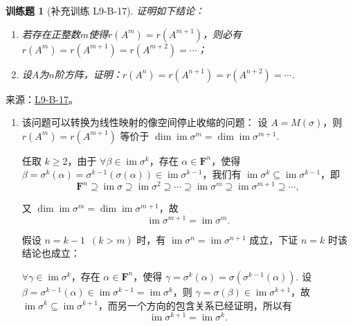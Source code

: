 \documentclass[12pt,fontset=fandol]{ctexart}
\newtheorem{exercise}{训练题}[section]
\begin{document}
\begin{exercise}[补充训练 L9-B-17]\label{prob:L9-B-17}
证明如下结论：
        \begin{enumerate}
            \item 若存在正整数$m$使得$r(A^m)=r(A^{m+1})$，则必有$r(A^m)=r(A^{m+1})=r(A^{m+2})=\cdots$；
            \item 设$A$为$n$阶方阵，证明：$r(A^n)=r(A^{n+1})=r(A^{n+2})=\cdots$.
        \end{enumerate}
\end{exercise}
\noindent 来源：\href{https://github.com/yhwu-is/Linear-Algebra-Left-Undone/blob/new/%E8%AE%B2%E4%B9%89/%E4%B8%93%E9%A2%98/9%20%E7%9F%A9%E9%98%B5%E8%BF%90%E7%AE%97%E8%BF%9B%E9%98%B6.tex}{L9-B-17}。
\begin{solve}
\begin{enumerate}
                \item 该问题可以转换为线性映射的像空间停止收缩的问题：
                    设 $A = M(\sigma)$，则 $r(A^m) = r(A^{m+1})$ 等价于 $\dim \operatorname{im} \sigma^m = \dim \operatorname{im} \sigma^{m+1}$.

                    任取 $k \geqslant 2$，由于 $\forall \beta \in \operatorname{im} \sigma^k$，存在 $\alpha \in \mathbf{F}^n$，使得 $\beta = \sigma^k(\alpha) = \sigma^{k-1}(\sigma(\alpha)) \in \operatorname{im} \sigma^{k-1}$，我们有 $\operatorname{im} \sigma^k \subseteq \operatorname{im} \sigma^{k-1}$，即
                    \[
                        \mathbf{F}^n \supseteq \operatorname{im} \sigma \supseteq \operatorname{im} \sigma^2 \supseteq \cdots \supseteq \operatorname{im} \sigma^m \supseteq \operatorname{im} \sigma^{m+1} \supseteq \cdots,
                    \]

                    又 $\dim \operatorname{im} \sigma^m = \dim \operatorname{im} \sigma^{m+1}$，故
                    \[
                        \operatorname{im} \sigma^{m+1} = \operatorname{im} \sigma^m.
                    \]

                    假设 $n=k-1 \enspace (k > m)$ 时，有 $\operatorname{im} \sigma^n = \operatorname{im} \sigma^{n+1}$ 成立，下证 $n=k$ 时该结论也成立：

                    $\forall \gamma \in \operatorname{im} \sigma^k$，存在 $\alpha \in \mathbf{F}^n$，使得 $\gamma = \sigma^k(\alpha) = \sigma(\sigma^{k-1}(\alpha))$. 设 $\beta = \sigma^{k-1}(\alpha) \in \operatorname{im} \sigma^{k-1} = \operatorname{im} \sigma^k$，则 $\gamma = \sigma(\beta) \in \operatorname{im} \sigma^{k+1}$，故 $\operatorname{im} \sigma^k \subseteq \operatorname{im} \sigma^{k+1}$，而另一个方向的包含关系已经证明，所以有
                    \[
                        \operatorname{im} \sigma^{k+1} = \operatorname{im} \sigma^k.
                    \]


\end{enumerate}
\end{solve}
\end{document}
